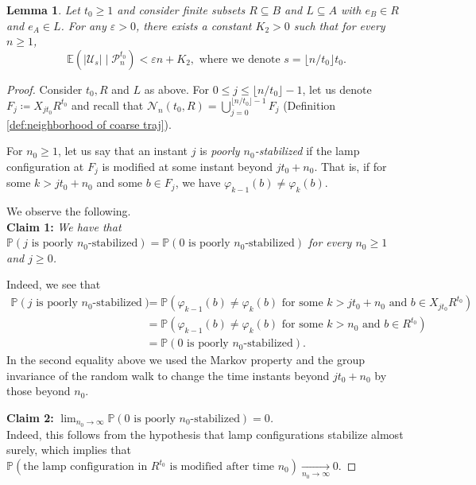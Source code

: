 \documentclass[reqno,oneside,11pt]{amsart}
\renewcommand{\P}{\mathbb{P}}
\newcommand{\E}{\mathbb{E}}
\theoremstyle{plain}
\newtheorem{lem}[thm]{Lemma}
\theoremstyle{definition}
\begin{document}
\begin{lem}\label{lem: expectation of unstable points is small} Let $t_0\ge 1$ and consider finite subsets $R\subseteq B$ and $L\subseteq A$ with $e_B\in R$ and $e_A\in L$. For any $\varepsilon>0$, there exists a constant $K_2>0$ such that for every $n\ge 1$, 
	\begin{equation*}\E\left(|\mathcal{U}_s| \mid \mathcal{P}_n^{t_0}\right)<\varepsilon n+K_2, \text{ where we denote }s=\lfloor n/t_0\rfloor t_0.
	\end{equation*}
\end{lem}
\begin{proof}
	Consider $t_0,R$ and $L$ as above. For $0\le j\le \lfloor n/t_0\rfloor-1$, let us denote $F_j\coloneqq X_{jt_0}R^{t_0}$ and recall that $\mathcal{N}_n(t_0,R)=\bigcup_{j=0}^{\lfloor n/t_0\rfloor-1}F_j$ (Definition \ref{def:neighborhood of coarse traj}).
	
	For $n_0\ge 1$, let us say that an instant $j$ is \emph{poorly $n_0$-stabilized} if the lamp configuration at $F_j$ is modified at some instant beyond $jt_0+n_0$. That is, if for some $k>jt_0+n_0$ and some $b\in F_j$, we have $\varphi_{k-1}(b)\neq \varphi_{k}(b)$.
	
	We observe the following.\\
	\textbf{Claim 1:} \textit{We have that \( \P(j \text{ is poorly }n_0\text{-stabilized})=\P(0 \text{ is poorly }n_0\text{-stabilized})\) for every $n_0\ge 1$ and $j\ge 0$.}
	
	
	Indeed, we see that
	\begin{align*}
		\P(j \text{ is poorly }n_0\text{-stabilized})&=\P(\varphi_{k-1}(b)\neq \varphi_{k}(b)\text{ for some }k>jt_0+n_0\text{ and }b\in X_{jt_0}R^{t_0})\\
		&=\P(\varphi_{k-1}(b)\neq \varphi_{k}(b)\text{ for some }k>n_0\text{ and }b\in R^{t_0})\\
		&=\P(0 \text{ is poorly }n_0\text{-stabilized}).
	\end{align*}
	In the second equality above we used the Markov property and the group invariance of the random walk to change the time instants beyond $jt_0+n_0$ by those beyond $n_0$.
	
	\textbf{Claim 2:}\textit{ $\lim_{n_0\to \infty}\P(0 \text{ is poorly }n_0\text{-stabilized})=0$.}\\
	Indeed, this follows from the hypothesis that lamp configurations stabilize almost surely, which implies that $\P(\text{the lamp configuration in }R^{t_0} \text{ is modified after time $n_0$})\xrightarrow[n_0\to \infty]{}0.$
	

\end{proof}
\end{document}
